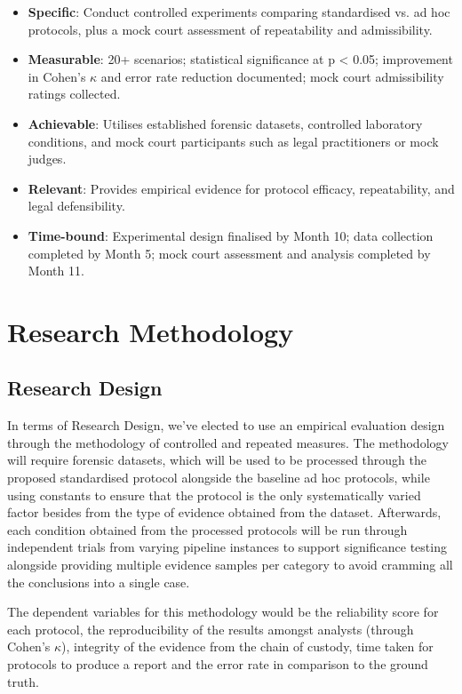 \documentclass[a4paper]{report}
\begin{document}
\begin{justify}
\begin{itemize}
    \item \textbf{Specific}: Conduct controlled experiments comparing standardised vs. ad hoc protocols, plus a mock court assessment of repeatability and admissibility.
    \item \textbf{Measurable}: 20+ scenarios; statistical significance at p < 0.05; improvement in Cohen’s $\kappa$ and error rate reduction documented; mock court admissibility ratings collected.
    \item \textbf{Achievable}: Utilises established forensic datasets, controlled laboratory conditions, and mock court participants such as legal practitioners or mock judges.
    \item \textbf{Relevant}: Provides empirical evidence for protocol efficacy, repeatability, and legal defensibility.
    \item \textbf{Time-bound}: Experimental design finalised by Month 10; data collection completed by Month 5; mock court assessment and analysis completed by Month 11.
\end{itemize}


\chapter{Research Methodology}

\section{Research Design}

In terms of Research Design, we’ve elected to use an empirical evaluation design through the methodology of controlled and repeated measures. The methodology will require forensic datasets, which will be used to be processed through the proposed standardised protocol alongside the baseline ad hoc protocols, while using constants to ensure that the protocol is the only systematically varied factor besides from the type of evidence obtained from the dataset. Afterwards, each condition obtained from the processed protocols will be run through independent trials from varying pipeline instances to support significance testing alongside providing multiple evidence samples per category to avoid cramming all the conclusions into a single case.

The dependent variables for this methodology would be the reliability score for each protocol, the reproducibility of the results amongst analysts (through Cohen’s $\kappa$), integrity of the evidence from the chain of custody, time taken for protocols to produce a report and the error rate in comparison to the ground truth.


\end{justify}
\end{document}
